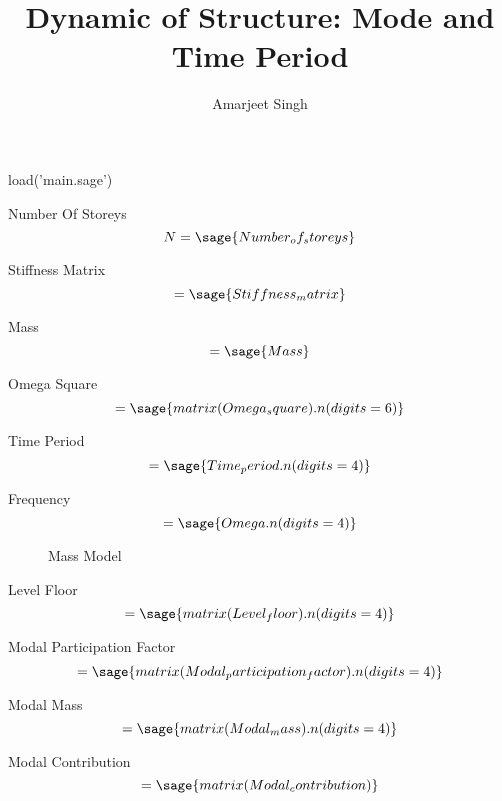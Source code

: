 \documentclass[12pt]{report}
\title{Dynamic of Structure: Mode and Time Period}
\author{Amarjeet Singh }
\begin{document}
\thispagestyle{plain}
	\begin{titlepage}
\maketitle
	\end{titlepage}

\begin{sagesilent}
	load('main.sage')
\end{sagesilent}

Number Of Storeys
\begin{equation}
	N = \sage{Number_of_storeys}
\end{equation}

Stiffness Matrix
\begin{equation}
	[K]=\sage{Stiffness_matrix}
\end{equation}

Mass
\begin{equation}
	 [M]=\sage{Mass}
\end{equation}

Omega Square
\begin{equation}
	[\omega^2] =\sage{matrix(Omega_square).n(digits=6)}
\end{equation}

Time Period
\begin{equation}
	[T]=\sage{Time_period.n(digits=4)}
\end{equation}

Frequency
\begin{equation}
	[\omega]=\sage{Omega.n(digits=4)}
\end{equation}

\begin{figure}
	\caption{Mass Model} 
\end{figure}

Level Floor
\begin{equation}
	[L]=\sage{matrix(Level_floor).n(digits=4)}
\end{equation}

Modal Participation Factor
\begin{equation}
	 [p]=\sage{matrix(Modal_participation_factor).n(digits=4)}
\end{equation}

Modal Mass
\begin{equation}
	 [M_{{m}}]=\sage{matrix(Modal_mass).n(digits=4)}
\end{equation}

Modal Contribution
\begin{equation}
	[M_{{c}}]=\sage{matrix(Modal_contribution)}
\end{equation}
\end{document}
